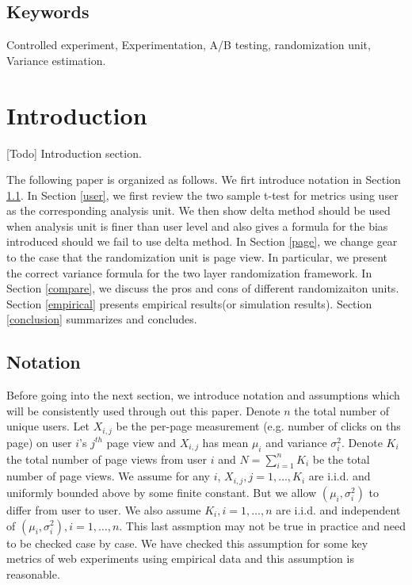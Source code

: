 \documentclass[10pt]{article}
\begin{document}
\subsection*{Keywords}
Controlled experiment, Experimentation, A/B testing, randomization unit, Variance estimation. 


\section{Introduction}
[Todo]  Introduction section. 

The following paper is organized as follows. We firt introduce notation in Section \ref{notation}. In Section \ref{user}, we first review the two sample t-test for  metrics using user as the corresponding analysis unit. We then show delta method should be used when analysis unit is finer than user level and also gives a formula for the bias introduced should we fail to use delta method. In Section \ref{page}, we change gear to the case that the randomization unit is page view. In particular, we present the correct variance formula for the two layer randomization framework. In Section \ref{compare}, we discuss the pros and cons of different randomizaiton units. 
Section \ref{empirical} presents empirical results(or simulation results). Section \ref{conclusion} summarizes and concludes. 

\subsection{Notation}\label{notation}
Before going into the next section, we introduce notation and assumptions which will be consistently used through out this paper. Denote $n$ the total number of unique users. Let $X_{i,j}$ be the per-page measurement (e.g. number of clicks on ths page) on user $i$'s $j^{th}$ page view and $X_{i,j}$ has mean $\mu_i$ and variance $\sigma_i^2$.  Denote $K_i$ the total number of page views from user $i$ and $N = \sum_{i=1}^n K_i$ be the total number of page views. We assume for any $i$, $X_{i,j},j=1,\dots,K_i$ are i.i.d. and uniformly bounded above by some finite constant.  But we allow $(\mu_i,\sigma_i^2)$ to differ from user to user. We also assume $K_i,i=1,\dots,n$ are i.i.d. and independent of $(\mu_i,\sigma_i^2),i=1,\dots,n$. This last assmption may not be true in practice and need to be checked case by case. We have checked this assumption for some key metrics of web experiments using empirical data and this assumption is reasonable.
\end{document}
